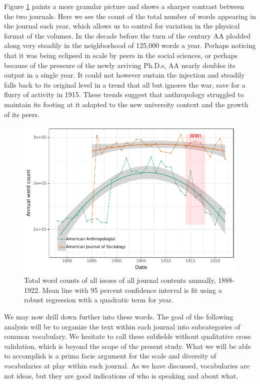 \documentclass[]{book}
\theoremstyle{definition}
\theoremstyle{definition}
\theoremstyle{definition}
\theoremstyle{remark}
\begin{document}
Figure \ref{fig:pre2ntok} paints a more granular picture and shows a
sharper contrast between the two journals. Here we see the count of the
total number of words appearing in the journal each year, which allows
us to control for variation in the physical format of the volumes. In
the decade before the turn of the century AA plodded along very steadily
in the neighborhood of 125,000 words a year. Perhaps noticing that it
was being eclipsed in scale by peers in the social sciences, or perhaps
because of the pressure of the newly arriving Ph.D.s, AA nearly doubles
its output in a single year. It could not however sustain the injection
and steadily falls back to its original level in a trend that all but
ignores the war, save for a flurry of activity in 1915. These trends
suggest that anthropology struggled to maintain its footing at it
adapted to the new university context and the growth of its peers.

\begin{figure}

{\centering \includegraphics[width=0.9\linewidth]{04_files/figure-latex/pre2ntok-1} 

}

\caption{Total word counts of all issues of all journal contents annually, 1888-1922.  Mean line with 95 percent confidence interval is fit using a robust regression with a quadratic term for year.}\label{fig:pre2ntok}
\end{figure}

We may now drill down further into these words. The goal of the
following analysis will be to organize the text within each journal into
subcategories of common vocabulary. We hesitate to call these subfields
without qualitative cross validation, which is beyond the scope of the
present study. What we will be able to accomplish is a prima facie
argument for the scale and diversity of vocabularies at play within each
journal. As we have discussed, vocabularies are not ideas, but they are
good indications of who is speaking and about what.
\end{document}
